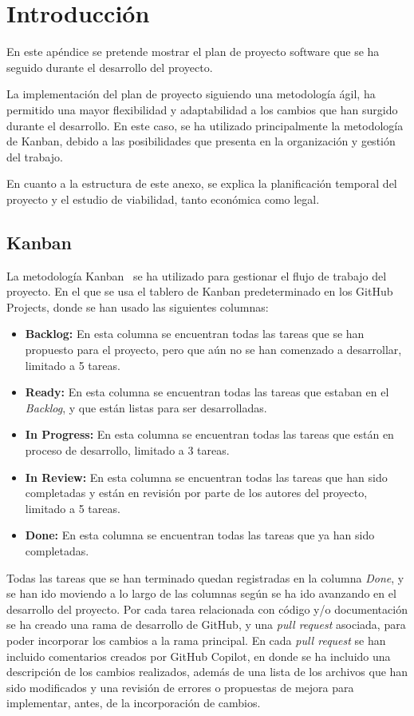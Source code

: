 
\section{Introducción}
En este apéndice se pretende mostrar el plan de proyecto software que se ha seguido durante el desarrollo del proyecto.

La implementación del plan de proyecto siguiendo una metodología ágil, ha permitido una mayor flexibilidad y adaptabilidad a los cambios que han surgido durante el desarrollo. En este caso, se ha utilizado principalmente la metodología de Kanban, debido a las posibilidades que presenta en la organización y gestión del trabajo.

En cuanto a la estructura de este anexo, se explica la planificación temporal del proyecto y el estudio de viabilidad, tanto económica como legal. 

\subsection{Kanban}
La metodología Kanban~\cite{JuliaMartins2025} se ha utilizado para gestionar el flujo de trabajo del proyecto. En el que se usa el tablero de Kanban predeterminado en los GitHub Projects, donde se han usado las siguientes columnas:
\begin{itemize}
    \item \textbf{Backlog:} En esta columna se encuentran todas las tareas que se han propuesto para el proyecto, pero que aún no se han comenzado a desarrollar, limitado a 5 tareas.
    \item \textbf{Ready:} En esta columna se encuentran todas las tareas que estaban en el \textit{Backlog}, y que están listas para ser desarrolladas.
    \item \textbf{In Progress:} En esta columna se encuentran todas las tareas que están en proceso de desarrollo, limitado a 3 tareas.
    \item \textbf{In Review:} En esta columna se encuentran todas las tareas que han sido completadas y están en revisión por parte de los autores del proyecto, limitado a 5 tareas.
    \item \textbf{Done:} En esta columna se encuentran todas las tareas que ya han sido completadas.
\end{itemize}

Todas las tareas que se han terminado quedan registradas en la columna \textit{Done}, y se han ido moviendo a lo largo de las columnas según se ha ido avanzando en el desarrollo del proyecto. Por cada tarea relacionada con código y/o documentación se ha creado una rama de desarrollo de GitHub, y una \textit{pull request} asociada, para poder incorporar los cambios a la rama principal.
En cada \textit{pull request} se han incluido comentarios creados por GitHub Copilot, en donde se ha incluido una descripción de los cambios realizados, además de una lista de los archivos que han sido modificados y una revisión de errores o propuestas de mejora para implementar, antes, de la incorporación de cambios.

